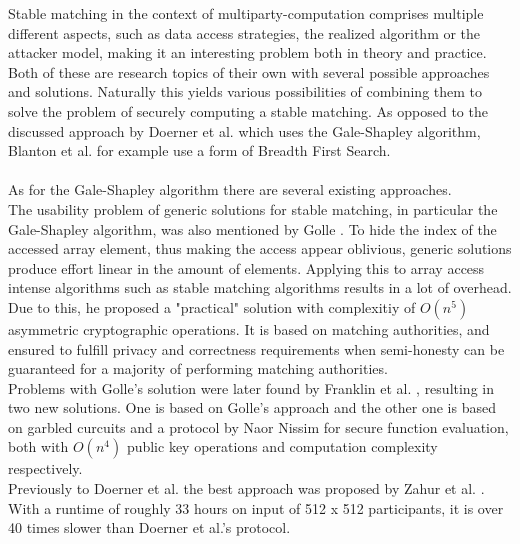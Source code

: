 Stable matching in the context of multiparty-computation comprises multiple different aspects, such as data access strategies, the realized algorithm or the attacker model, making it an interesting problem both in theory and practice. Both of these are research topics of their own with several possible approaches and solutions. Naturally this yields various possibilities of combining them to solve the problem of securely computing a stable matching. As opposed to the discussed approach by Doerner et al. \citep{smas} which uses the Gale-Shapley algorithm, Blanton et al. \citep{dogafscao} for example use a form of Breadth First Search.\\
\ \\As for the Gale-Shapley algorithm there are several existing approaches. 
\ \\The usability problem of generic solutions for stable matching, in particular the Gale-Shapley algorithm, was also mentioned by Golle \citep{apsma}. To hide the index of the accessed array element, thus making the access appear oblivious, generic solutions produce effort linear in the amount of elements. Applying this to array access intense algorithms such as stable matching algorithms results in a lot of overhead. Due to this, he proposed a "practical" solution with complexitiy of $O(n^5)$ asymmetric cryptographic operations. It is based on matching authorities, and ensured to fulfill privacy and correctness requirements when semi-honesty can be guaranteed for a majority of performing matching authorities. \\
Problems with Golle's solution were later found by Franklin et al. \citep{iefpsm}, resulting in two new solutions. One is based on Golle's approach and the other one is based on garbled curcuits and a protocol by Naor Nissim for secure function evaluation, both with $O(n^4)$ public key operations and computation complexity respectively.\\
Previously to Doerner et al. the best approach was proposed by Zahur et al. \citep{rsqo}. With a runtime of roughly 33 hours on input of 512 x 512 participants, it is over 40 times slower than Doerner et al.'s protocol. 